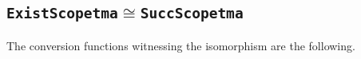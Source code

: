 \documentclass[9pt,preprint,authoryear]{sigplanconf}
\begin{document}
\subsection{\textcolor[rgb]{0,0,0.80}{\texttt{ExistScope}}\textcolor[rgb]{0,0,0.80}{\texttt{\mbox{\hspace{0.50em}}}}\textcolor[rgb]{0,0,0.80}{\texttt{tm}}\textcolor[rgb]{0,0,0.80}{\texttt{\mbox{\hspace{0.50em}}}}\textcolor[rgb]{0,0,0.80}{\texttt{a}}\textcolor[rgb]{0,0,0.80}{\texttt{\mbox{\hspace{0.50em}}}}\textcolor[rgb]{0.70,0.13,0.13}{\texttt{\ensuremath{\cong}}}\textcolor[rgb]{0,0,0.80}{\texttt{\mbox{\hspace{0.50em}}}}\textcolor[rgb]{0,0,0.80}{\texttt{SuccScope}}\textcolor[rgb]{0,0,0.80}{\texttt{\mbox{\hspace{0.50em}}}}\textcolor[rgb]{0,0,0.80}{\texttt{tm}}\textcolor[rgb]{0,0,0.80}{\texttt{\mbox{\hspace{0.50em}}}}\textcolor[rgb]{0,0,0.80}{\texttt{a}} }

%
The conversion functions witnessing the isomorphism are the
    following.%


{\nopagebreak }
\end{document}
